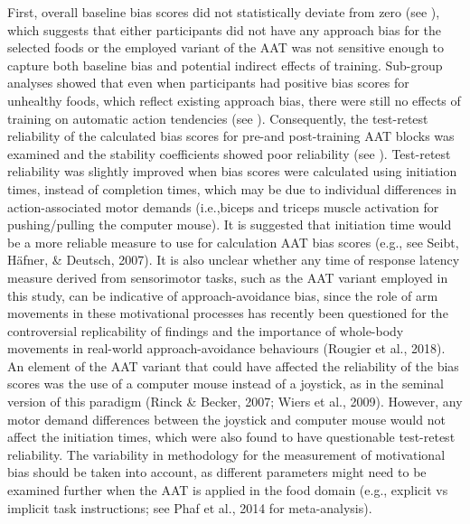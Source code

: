 \documentclass[man,floatsintext]{apa6}
\begin{document}
First, overall baseline bias scores did not statistically deviate from zero (see \textit{}), which suggests that either participants did not have any approach bias for the selected foods or the employed variant of the AAT was not sensitive enough to capture both baseline bias and potential indirect effects of training. Sub-group analyses showed that even when participants had positive bias scores for unhealthy foods, which reflect existing approach bias, there were still no effects of training on automatic action tendencies (see \textit{}). Consequently, the test-retest reliability of the calculated bias scores for pre-and post-training AAT blocks was examined and the stability coefficients showed poor reliability (see \textit{}). Test-retest reliability was slightly improved when bias scores were calculated using initiation times, instead of completion times, which may be due to individual differences in action-associated motor demands (i.e.,biceps and triceps muscle activation for pushing/pulling the computer mouse). It is suggested that initiation time would be a more reliable measure to use for calculation AAT bias scores (e.g., see Seibt, Häfner, \& Deutsch, 2007). It is also unclear whether any time of response latency measure derived from sensorimotor tasks, such as the AAT variant employed in this study, can be indicative of approach-avoidance bias, since the role of arm movements in these motivational processes has recently been questioned for the controversial replicability of findings and the importance of whole-body movements in real-world approach-avoidance behaviours (Rougier et al., 2018). An element of the AAT variant that could have affected the reliability of the bias scores was the use of a computer mouse instead of a joystick, as in the seminal version of this paradigm (Rinck \& Becker, 2007; Wiers et al., 2009). However, any motor demand differences between the joystick and computer mouse would not affect the initiation times, which were also found to have questionable test-retest reliability. The variability in methodology for the measurement of motivational bias should be taken into account, as different parameters might need to be examined further when the AAT is applied in the food domain (e.g., explicit vs implicit task instructions; see Phaf et al., 2014 for meta-analysis).

\par
\end{document}

